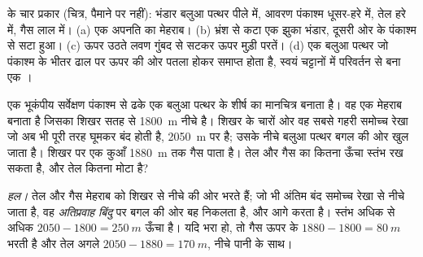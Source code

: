 \begin{omfigure}

{\small {} के चार प्रकार (चित्र, पैमाने पर नहीं): भंडार बलुआ पत्थर
पीले में, आवरण पंकाश्म धूसर-हरे में, तेल हरे में, गैस लाल में। (a) एक
अपनति का मेहराब। (b) भ्रंश से कटा एक झुका भंडार, दूसरी ओर के
पंकाश्म से सटा हुआ। (c) ऊपर उठते लवण गुंबद से सटकर ऊपर मुड़ी परतें।
(d) एक बलुआ पत्थर जो पंकाश्म के भीतर ढाल पर ऊपर की ओर पतला होकर समाप्त होता है, स्वयं चट्टानों में
परिवर्तन से बना एक ।}
\end{omfigure}

\begin{example}[अपनति में एक ट्रैप]\label{ex:g11:fossil-fuel-geology:anticline}
एक भूकंपीय सर्वेक्षण पंकाश्म से ढके एक बलुआ पत्थर के शीर्ष का मानचित्र बनाता है। वह एक
मेहराब बनाता है जिसका शिखर सतह से \qty{1800}{m} नीचे है। शिखर के चारों ओर
वह सबसे गहरी समोच्च रेखा जो अब भी पूरी तरह घूमकर बंद होती है,
\qty{2050}{m} पर है; उसके नीचे बलुआ पत्थर बगल की ओर खुल जाता है। शिखर पर एक कुआँ
\qty{1880}{m} तक गैस पाता है।  तेल और गैस का कितना ऊँचा स्तंभ
रख सकता है, और तेल कितना मोटा है?

\emph{हल।} तेल और गैस मेहराब को शिखर से नीचे की ओर भरते हैं; जो भी
अंतिम बंद समोच्च रेखा से नीचे जाता है, वह \emph{अतिप्रवाह बिंदु} पर बगल की ओर
बह निकलता है, और आगे  करता है। स्तंभ अधिक से अधिक
$2050 - 1800 = \qty{250}{m}$ ऊँचा है। यदि  भरा हो, तो गैस ऊपर के
$1880 - 1800 = \qty{80}{m}$ भरती है और तेल अगले $2050 - 1880 = \qty{170}{m}$,
नीचे पानी के साथ।
\end{example}


